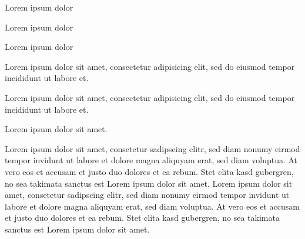 \documentclass{article}
\begin{document}


\begin{clozebox}
Lorem ipsum dolor
\end{clozebox}

\clozereset


\begin{clozebox}
Lorem ipsum dolor
\end{clozebox}


\begin{clozebox}[width = 1cm, rule=0.1cm]
Lorem ipsum dolor
\end{clozebox}


\clozehide

\begin{clozebox}
Lorem ipsum dolor sit amet, consectetur adipisicing elit, sed do eiusmod
tempor incididunt ut labore et.
\end{clozebox}


\clozeshow

\begin{clozebox}
Lorem ipsum dolor sit amet, consectetur adipisicing elit, sed do eiusmod
tempor incididunt ut labore et.
\end{clozebox}


\begin{clozebox}
Lorem ipsum dolor sit amet.
\end{clozebox}


\begin{clozebox}
Lorem ipsum dolor sit amet, consetetur sadipscing elitr, sed diam nonumy
eirmod tempor invidunt ut labore et dolore magna aliquyam erat, sed diam
voluptua. At vero eos et accusam et justo duo dolores et ea rebum. Stet
clita kasd gubergren, no sea takimata sanctus est Lorem ipsum dolor sit
amet. Lorem ipsum dolor sit amet, consetetur sadipscing elitr, sed diam
nonumy eirmod tempor invidunt ut labore et dolore magna aliquyam erat,
sed diam voluptua. At vero eos et accusam et justo duo dolores et ea
rebum. Stet clita kasd gubergren, no sea takimata sanctus est Lorem
ipsum dolor sit amet.
\end{clozebox}
\end{document}
